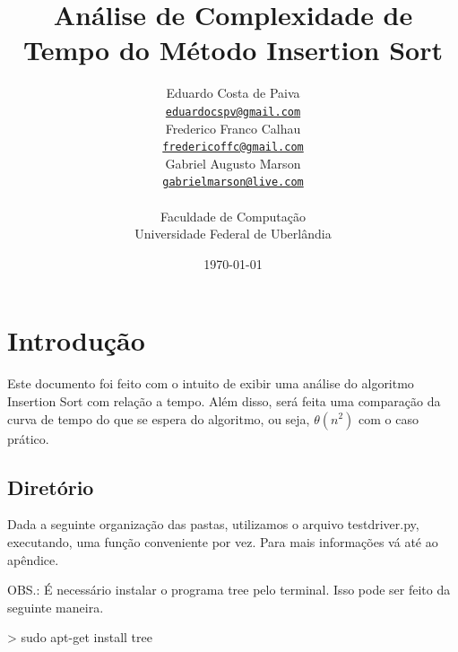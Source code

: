 \documentclass[12pt,a4paper,twoside]{report}
\title{Análise de Complexidade de Tempo do Método Insertion Sort}
\date{}
\author{Eduardo Costa de Paiva \\
\texttt{\small \url{eduardocspv@gmail.com}}\\
Frederico Franco Calhau \\
\texttt{\small \url{fredericoffc@gmail.com}}\\
Gabriel Augusto Marson \\
\texttt{\small \url{gabrielmarson@live.com}}\\
\vspace{1cm} \\
Faculdade de Computação \\
Universidade Federal de Uberlândia
}
\date{\today}
\begin{document}
  \maketitle
\listoffigures
\listoftables
\lstlistoflistings

\tableofcontents


\fancyhead[RE,LO]{\thesection}

\setlength{\parskip}{0.15in} %

\chapter{Introdução}
Este documento foi feito com o intuito de exibir uma análise do algoritmo Insertion Sort
com relação a tempo. Além disso, será feita uma comparação da curva de tempo do que se espera do
algoritmo, ou seja, $\theta(n^2)$ com o caso prático.

\section{Diretório}

Dada a seguinte organização das pastas, utilizamos o arquivo testdriver.py,  executando, uma função conveniente por vez. Para mais informações vá até ao apêndice.

OBS.: É necessário instalar o programa tree pelo terminal. Isso pode ser feito da seguinte maneira.

\begin{terminal}
> sudo apt-get install tree
\end{terminal}
\end{document}
